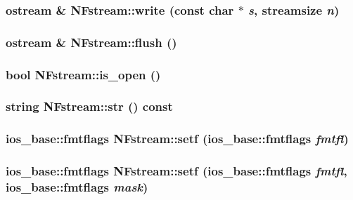 \subsubsection{\setlength{\rightskip}{0pt plus 5cm}ostream \& NFstream::write (const char $\ast$ {\em s}, streamsize {\em n})}\label{classNFstream_67df869f900fc3458ca7e0e4ea4f72d0}


\subsubsection{\setlength{\rightskip}{0pt plus 5cm}ostream \& NFstream::flush ()}\label{classNFstream_206d7748099ca36ff0cc6d28d91f0ab3}


\subsubsection{\setlength{\rightskip}{0pt plus 5cm}bool NFstream::is\_\-open ()}\label{classNFstream_133725f3744355e8ee25203b3badd35d}


\subsubsection{\setlength{\rightskip}{0pt plus 5cm}string NFstream::str () const}\label{classNFstream_93c1d951036a96dd1373f042c4af28e7}


\subsubsection{\setlength{\rightskip}{0pt plus 5cm}ios\_\-base::fmtflags NFstream::setf (ios\_\-base::fmtflags {\em fmtfl})}\label{classNFstream_ef89eac7cde90bb0730d27e2a419c60d}


\subsubsection{\setlength{\rightskip}{0pt plus 5cm}ios\_\-base::fmtflags NFstream::setf (ios\_\-base::fmtflags {\em fmtfl}, ios\_\-base::fmtflags {\em mask})}\label{classNFstream_fb58e08974008c64eaef670426924a74}


